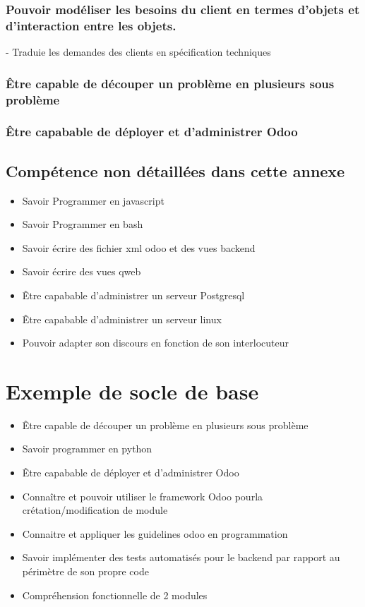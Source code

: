 \subsubsection{Pouvoir modéliser les besoins du client en termes d'objets et d'interaction entre les objets.}
 - Traduie les demandes des clients en spécification techniques
\subsubsection{Être capable de découper un problème en plusieurs sous problème}


\subsubsection{Être capabable de déployer et d'administrer Odoo}

\subsection{Compétence non détaillées dans cette annexe}
\begin{itemize}
 \item Savoir Programmer en javascript
 \item Savoir Programmer en bash
 \item Savoir écrire des fichier xml odoo et des vues backend
 \item Savoir écrire des vues qweb
 \item Être capabable d'administrer un serveur Postgresql
 \item Être capabable d'administrer un serveur linux
 \item Pouvoir adapter son discours en fonction de son interlocuteur
 
\end{itemize}


\section{Exemple de socle de base}
\begin{itemize}
 \item Être capable de découper un problème en plusieurs sous problème
 \item Savoir programmer en python
 \item Être capabable de déployer et d'administrer Odoo
 \item Connaître et pouvoir utiliser le framework Odoo pourla crétation/modification de module
 \item Connaitre et appliquer les guidelines odoo en programmation
 \item Savoir implémenter des tests automatisés pour le backend par rapport au périmètre de son propre code
 \item Compréhension fonctionnelle de 2 modules
\end{itemize}


